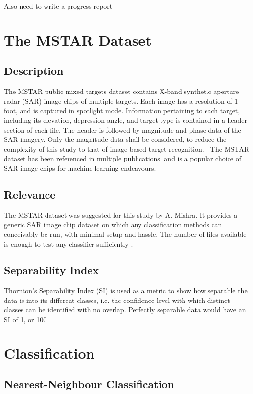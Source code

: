 Also need to write a progress report

\section{The MSTAR Dataset}
\subsection{Description}
The MSTAR public mixed targets dataset contains X-band synthetic aperture radar (SAR) image chips of multiple targets. Each image has a resolution of 1 foot, and is captured in spotlight mode. Information pertaining to each target, including its elevation, depression angle, and target type is contained in a header section of each file. The header is followed by magnitude and phase data of the SAR imagery. Only the magnitude data shall be considered, to reduce the complexity of this study to that of image-based target recognition. \cite{Schumacher_atrof}.
The MSTAR dataset has been referenced in multiple publications, and is a popular choice of SAR image chips for machine learning endeavours. 
\subsection{Relevance}
The MSTAR dataset was suggested for this study by A. Mishra. It provides a generic SAR image chip dataset on which any classification methods can conceivably be run, with minimal setup and hassle. The number of files available is enough to test any classifier sufficiently .

\subsection{Separability Index}\label{lit:SI}
Thornton's Separability Index (SI) is used as a metric to show how separable the data is into its different classes, i.e. the confidence level with which distinct classes can be identified with no overlap. Perfectly separable data would have an SI of 1, or 100%

\section{Classification}


\subsection{Nearest-Neighbour Classification}\label{lit:nn}
